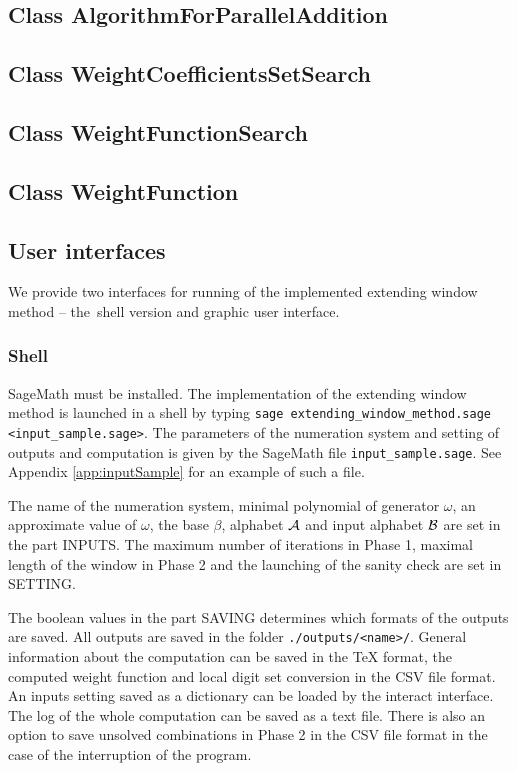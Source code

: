 \subsection*{Class AlgorithmForParallelAddition}



\subsection*{Class WeightCoefficientsSetSearch}



\subsection*{Class WeightFunctionSearch}



\subsection*{Class WeightFunction}


\subsection*{User interfaces}
We provide two interfaces for running of the implemented extending window method -- the~shell version and graphic user interface.

\subsubsection*{Shell}
SageMath must be installed. The implementation of the extending window method is launched in a shell by typing \verb+sage extending_window_method.sage <input_sample.sage>+. The parameters of the numeration system and setting of outputs and computation is given by the SageMath file \verb+input_sample.sage+. See Appendix \ref{app:inputSample} for an example of such a file.

The name of the numeration system, minimal polynomial of generator $\omega$, an approximate value of $\omega$, the base $\beta$, alphabet $\mathcal{A}$ and input alphabet $\mathcal{B}$ are set in the part INPUTS. The maximum number of iterations in Phase 1, maximal length of the window in Phase 2 and the launching of the sanity check are set in SETTING. 

The boolean values in the part SAVING determines which formats of the outputs are saved. All outputs are saved in the folder \verb+./outputs/<name>/+. General information about the computation can be saved in the TeX format, the computed weight function and local digit set conversion in the CSV file format. An inputs setting saved as a dictionary can be loaded by the interact interface. The log of the whole computation can be saved as a text file. There is also an option to save unsolved combinations in Phase 2 in the CSV file format in the case of the interruption of the program.

